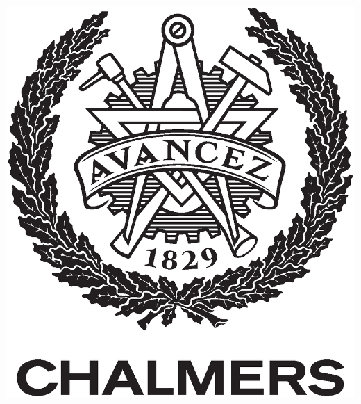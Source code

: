 {    \centerline{\includegraphics[width=0.2\pdfpagewidth]{template/figures/AvancezChalmers_black_centered.eps}}
    \fi

}
